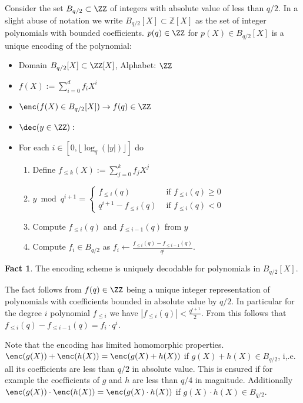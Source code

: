 \documentclass{article}
\theoremstyle{definition}
\newtheorem{fact}{Fact}
\begin{document}
	Consider the set $B_{q/2} \subset \ZZ$ of integers with absolute value of less than $q/2$. In a slight abuse of notation we write $B_{q/2}[X]\subset \mathbb{Z}[X]$ as the set of integer polynomials with bounded coefficients. $p(q) \in \ZZ$ for $p(X)\in B_{q/2}[X]$ is a unique encoding of the polynomial:
\begin{itemize}
	\item Domain $B_{q/2}[X]\subset \ZZ[X]$, Alphabet: $\ZZ$
	\item 	$f(X):=\sum_{i=0}^{d} f_i X^i$
	\item $\enc(f(X) \in B_{q/2}[X])\rightarrow  f(q) \in \ZZ$
	\item $\dec(y \in \ZZ):$
	\item For each $i \in [0,\lfloor \log_q(|y|)\rfloor]$ do\\
	\begin{enumerate}
		\item Define $f_{\leq k}(X):=\sum_{j=0}^k f_j X^j$
		\item $y \bmod q^{i+1}=\begin{cases} f_{\leq i}(q) &\text{ if } f_{\leq i}(q)\geq 0\\ q^{i+1} - f_{\leq i}(q) &\text{ if } f_{\leq i}(q)<0   \end{cases}$
		\item  Compute $f_{\leq i}(q)$ and $f_{\leq i-1}(q)$ from $y$
		\item  Compute $f_i\in B_{q/2}$ as $f_i \gets \frac{f_{\leq i}(q)-f_{\leq i-1}(q)}{q^i}$.
	\end{enumerate} 
\end{itemize}

\begin{fact}
	The encoding scheme is uniquely decodable for polynomials in $B_{q/2}[X]$.
\end{fact}
The fact follows from $f(q)\in \ZZ$ being a unique integer representation of polynomials with coefficients bounded in absolute value by $q/2$. In particular for the degree $i$ polynomial $f_{\leq i}$ we have $|f_{\leq i}(q)|<\frac{q^{i+1}}{2}$. From this follows that $f_{\leq i}(q)-f_{\leq i-1}(q)=f_i \cdot q^i$.  

Note that the encoding has limited homomorphic properties. $\enc(g(X))+\enc(h(X))=\enc(g(X)+h(X))$ if $g(X)+h(X)\in B_{q/2}$, i,.e. all its coefficients are less than $q/2$ in absolute value. This is ensured if for example the coefficients of $g$ and $h$ are less than $q/4$ in magnitude. Additionally $\enc(g(X))\cdot \enc(h(X))=\enc(g(X)\cdot h(X))$ if $g(X)\cdot h(X)\in B_{q/2}$.
\end{document}
